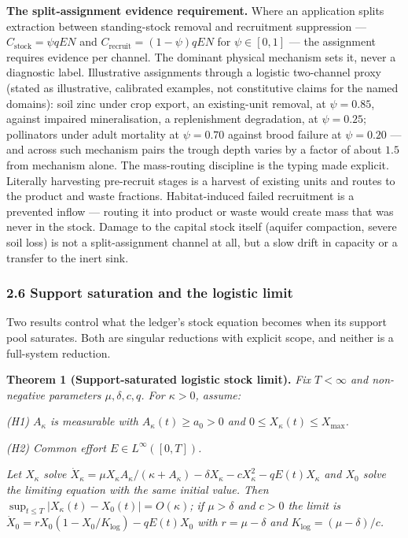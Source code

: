 \documentclass[11pt]{article}
\begin{document}
\textbf{The split-assignment evidence requirement.} Where an application
splits extraction between standing-stock removal and recruitment
suppression --- \(C_{\mathrm{stock}} = \psi qEN\) and
\(C_{\mathrm{recruit}} = (1-\psi)qEN\) for \(\psi \in [0,1]\) --- the
assignment requires evidence per channel. The dominant physical
mechanism sets it, never a diagnostic label. Illustrative assignments
through a logistic two-channel proxy (stated as illustrative, calibrated
examples, not constitutive claims for the named domains): soil zinc
under crop export, an existing-unit removal, at \(\psi = 0.85\), against
impaired mineralisation, a replenishment degradation, at
\(\psi = 0.25\); pollinators under adult mortality at \(\psi = 0.70\)
against brood failure at \(\psi = 0.20\) --- and across such mechanism
pairs the trough depth varies by a factor of about \(1.5\) from
mechanism alone. The mass-routing discipline is the typing made
explicit. Literally harvesting pre-recruit stages is a harvest of
existing units and routes to the product and waste fractions.
Habitat-induced failed recruitment is a prevented inflow --- routing it
into product or waste would create mass that was never in the stock.
Damage to the capital stock itself (aquifer compaction, severe soil
loss) is not a split-assignment channel at all, but a slow drift in
capacity or a transfer to the inert sink.

\subsubsection{2.6 Support saturation and the logistic
limit}\label{support-saturation-and-the-logistic-limit}

Two results control what the ledger's stock equation becomes when its
support pool saturates. Both are singular reductions with explicit
scope, and neither is a full-system reduction.

\textbf{Theorem 1 (Support-saturated logistic stock limit).} \emph{Fix
\(T < \infty\) and non-negative parameters \(\mu, \delta, c, q\). For
\(\kappa > 0\), assume:}

\emph{(H1) \(A_\kappa\) is measurable with \(A_\kappa(t) \ge a_0 > 0\)
and \(0 \le X_\kappa(t) \le X_{\max}\).}

\emph{(H2) Common effort \(E \in L^\infty([0,T])\).}

\emph{Let \(X_\kappa\) solve
\(\dot X_\kappa = \mu X_\kappa A_\kappa/(\kappa + A_\kappa) - \delta X_\kappa - cX_\kappa^2 - qE(t)X_\kappa\)
and \(X_0\) solve the limiting equation with the same initial value.
Then \(\sup_{t \le T} |X_\kappa(t) - X_0(t)| = O(\kappa)\); if
\(\mu > \delta\) and \(c > 0\) the limit is
\(\dot X_0 = rX_0(1 - X_0/K_{\log}) - qE(t)X_0\) with
\(r = \mu - \delta\) and \(K_{\log} = (\mu - \delta)/c\).}
\end{document}
